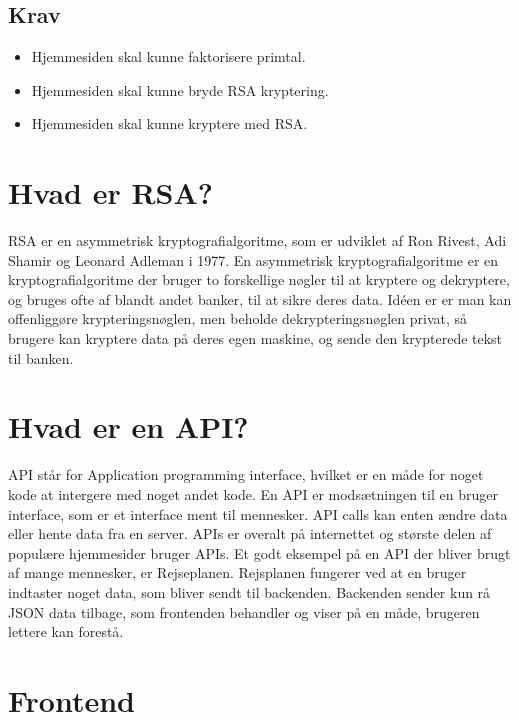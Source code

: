 \documentclass{article}
\begin{document}
    \subsection{Krav}\label{subsec:krav}
    \begin{itemize}
        \item Hjemmesiden skal kunne faktorisere primtal.
        \item Hjemmesiden skal kunne bryde RSA kryptering.
        \item Hjemmesiden skal kunne kryptere med RSA\@.
    \end{itemize}


    \section{Hvad er RSA?}\label{sec:hvad-er-rsa}
    RSA er en asymmetrisk kryptografialgoritme, som er udviklet af Ron Rivest, Adi Shamir og Leonard Adleman i 1977.
    En asymmetrisk kryptografialgoritme er en kryptografialgoritme der bruger to forskellige nøgler til at kryptere og dekryptere,
    og bruges ofte af blandt andet banker, til at sikre deres data.
    Idéen er er man kan offenliggøre krypteringsnøglen, men beholde dekrypteringsnøglen privat, så brugere kan kryptere data på deres egen maskine,
    og sende den krypterede tekst til banken.


    \section{Hvad er en API?}\label{sec:hvad-er-en-api}
    API står for Application programming interface, hvilket er en måde for noget kode at intergere med noget andet kode.
    En API er modsætningen til en bruger interface, som er et interface ment til mennesker.
    API calls kan enten ændre data eller hente data fra en server.
    APIs er overalt på internettet og største delen af populære hjemmesider bruger APIs.
    Et godt eksempel på en API der bliver brugt af mange mennesker, er Rejseplanen.
    Rejsplanen fungerer ved at en bruger indtaster noget data, som bliver sendt til backenden.
    Backenden sender kun rå JSON data tilbage, som frontenden behandler og viser på en måde, brugeren lettere kan forestå.


    \section{Frontend}\label{sec:frontend}
\end{document}

